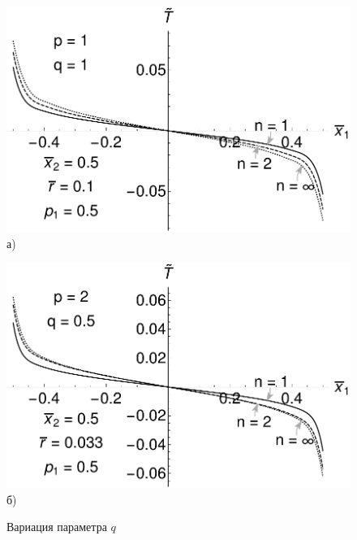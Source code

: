 \begin{figure}[ht]
    \begin{minipage}[b][][b]{0.49\linewidth}\centering
        \includegraphics[width=\linewidth]{pics/TPolyInfluenceVariationN.pdf} \\ а)
    \end{minipage}
    \hfill
    \begin{minipage}[b][][b]{0.49\linewidth}\centering
        \includegraphics[width=\linewidth]{pics/TExpInfluenceVariationN.pdf} \\ б)
    \end{minipage}
    \caption{Вариация параметра $q$}
    \label{fig:InfluenceVariationN}
\end{figure}

